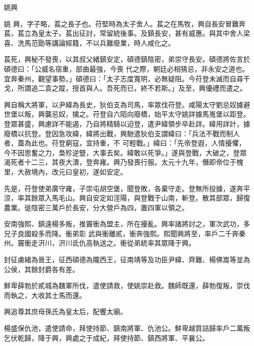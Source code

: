 
\begin{pinyinscope}
姚興



 姚
 興，字子略，萇之長子也。苻堅時為太子舍人。萇之在馬牧，興自長安冒難奔萇，萇立為皇太子。萇出征討，常留統後事。及鎮長安，甚有威惠。與其中舍人梁喜、洗馬范勖等講論經籍，不以兵難廢業，時人咸化之。



 萇死，興秘不發喪，以其叔父緒鎮安定，碩德鎮陰密，弟崇守長安。碩德將佐言於碩德曰：「公威名宿重，部曲最強，今喪
 代之際，朝廷必相猜忌，非永安之道也。宜奔秦州，觀望事勢。」碩德曰：「太子志度寬明，必無疑阻。今苻登未滅而自尋干戈，所謂追二袁之蹤，授首與人。吾死而已，終不若斯。」及至，興優禮而遣之。



 興自稱大將軍，以尹緯為長史，狄伯支為司馬，率眾伐苻登。咸陽太守劉忌奴據避世堡以叛，興襲忌奴，擒之。苻登自六陌向廢橋，始平太守姚詳據馬嵬堡以距登。登眾甚盛，興慮詳不能遏，乃自將精騎以迫登，遣尹緯領步卒赴詳。緯用詳計，據廢橋以抗登。登因急攻緯，緯將出戰，興馳遣狄伯支謂緯曰：「兵法不戰而制人者，蓋為此也。苻登窮寇，宜持重，不
 可輕戰。」緯曰：「先帝登遐，人情擾懼，今不因思奮之力，梟殄逆豎，大事去矣。緯敢以死爭。」遂與登戰，大破之，登眾渴死者十二三，其夜大潰，登奔雍。興乃發喪行服。太元十九年，僭即帝位于槐里，大赦境內，改元曰皇初，遂如安定。



 先是，苻登使弟廣守雍，子崇屯胡空堡，聞登敗，各棄守走。登無所投據，遂奔平涼，率其餘眾入馬毛山。興自安定如涇陽，與登戰于山南，斬登。散其部眾，歸復農業。徙陰密三萬戶於長安，分大營戶為四，置四軍以領之。



 安南強熙、鎮遠楊多叛，推竇衝為盟主，所在擾亂。興率諸將討之，軍次武功，多兄子良國殺多而降。衝弟彰
 武與衝離貳，衝奔強熙。熙聞興將至，率戶二千奔秦州。竇衝走汧川，汧川氐仇高執送之。衝從弟統率其眾降于興。



 封征虜緒為晉王，征西碩德為隴西王，征南靖等及功臣尹緯、齊難、楊佛嵩等並為公侯，其餘封爵各有差。



 鮮卑薛勃於貳城為魏軍所伐，遣使請救，使姚崇赴救。魏師既還，薛勃復叛，崇伐而執之，大收其士馬而還。



 興追尊其庶母孫氏為皇太后，配饗太廟。



 楊盛保仇池，遣使請命，拜使持節、鎮南將軍、仇池公。鮮卑越質詰歸率戶二萬叛乞伏乾歸，降于興，興處之于成紀，拜使持節、鎮西將軍、平襄公。




\end{pinyinscope}
